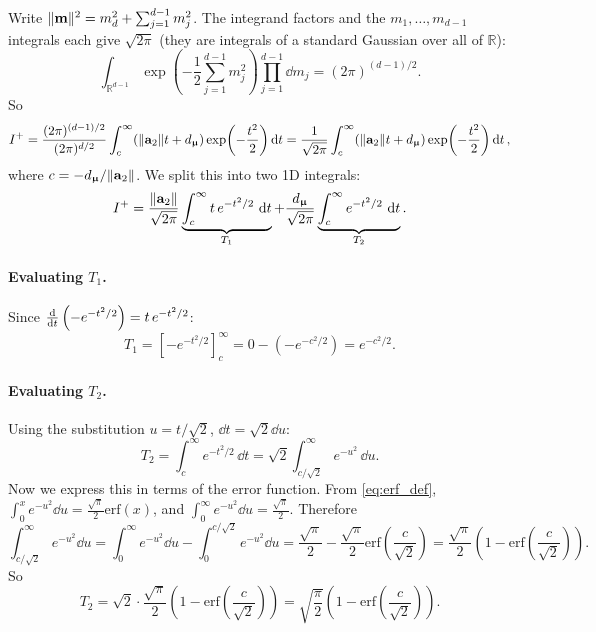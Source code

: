 \documentclass[11pt, letterpaper]{article}
\newcommand{\bmu}{\boldsymbol{\upmu}}
\newcommand{\R}{\mathbb{R}}
\begin{document}
Write $\|\vb{m}\|^2 = m_d^2 + \sum_{j=1}^{d-1}m_j^2$. The integrand factors and the $m_1, \ldots, m_{d-1}$ integrals each give $\sqrt{2\pi}$ (they are integrals of a standard Gaussian over all of $\R$):
\begin{equation}
    \int_{\R^{d-1}}\exp\!\left(-\frac{1}{2}\sum_{j=1}^{d-1}m_j^2\right)\prod_{j=1}^{d-1}\dd{m_j} = (2\pi)^{(d-1)/2}.
\end{equation}
So
\begin{equation}
    I^+ = \frac{(2\pi)^{(d-1)/2}}{(2\pi)^{d/2}} \int_{c}^{\infty}(\|\vb{a}_2\|t + d_{\bmu})\exp\!\left(-\frac{t^2}{2}\right)\dd{t} = \frac{1}{\sqrt{2\pi}}\int_c^{\infty}(\|\vb{a}_2\|t + d_{\bmu})\exp\!\left(-\frac{t^2}{2}\right)\dd{t},
\end{equation}
where $c = -d_{\bmu}/\|\vb{a}_2\|$. We split this into two 1D integrals:
\begin{equation}
    I^+ = \frac{\|\vb{a}_2\|}{\sqrt{2\pi}}\underbrace{\int_c^{\infty}t\,e^{-t^2/2}\,\dd{t}}_{T_1} + \frac{d_{\bmu}}{\sqrt{2\pi}}\underbrace{\int_c^{\infty}e^{-t^2/2}\,\dd{t}}_{T_2}.
\end{equation}

\paragraph{Evaluating $T_1$.} Since $\dv{t}\left(-e^{-t^2/2}\right) = t\,e^{-t^2/2}$:
\begin{equation}
    T_1 = \left[-e^{-t^2/2}\right]_c^{\infty} = 0 - \left(-e^{-c^2/2}\right) = e^{-c^2/2}.
\end{equation}

\paragraph{Evaluating $T_2$.} Using the substitution $u = t/\sqrt{2}$, $\dd{t} = \sqrt{2}\dd{u}$:
\begin{equation}
    T_2 = \int_c^{\infty}e^{-t^2/2}\,\dd{t} = \sqrt{2}\int_{c/\sqrt{2}}^{\infty}e^{-u^2}\,\dd{u}.
\end{equation}
Now we express this in terms of the error function. From \cref{eq:erf_def}, $\int_0^x e^{-u^2}\dd{u} = \frac{\sqrt{\pi}}{2}\mathrm{erf}(x)$, and $\int_0^{\infty}e^{-u^2}\dd{u} = \frac{\sqrt{\pi}}{2}$. Therefore
\begin{equation}
    \int_{c/\sqrt{2}}^{\infty}e^{-u^2}\dd{u} = \int_0^{\infty}e^{-u^2}\dd{u} - \int_0^{c/\sqrt{2}}e^{-u^2}\dd{u} = \frac{\sqrt{\pi}}{2} - \frac{\sqrt{\pi}}{2}\mathrm{erf}\!\left(\frac{c}{\sqrt{2}}\right) = \frac{\sqrt{\pi}}{2}\!\left(1 - \mathrm{erf}\!\left(\frac{c}{\sqrt{2}}\right)\right).
\end{equation}
So
\begin{equation}
    T_2 = \sqrt{2}\cdot\frac{\sqrt{\pi}}{2}\!\left(1 - \mathrm{erf}\!\left(\frac{c}{\sqrt{2}}\right)\right) = \sqrt{\frac{\pi}{2}}\!\left(1 - \mathrm{erf}\!\left(\frac{c}{\sqrt{2}}\right)\right).
\end{equation}
\end{document}
